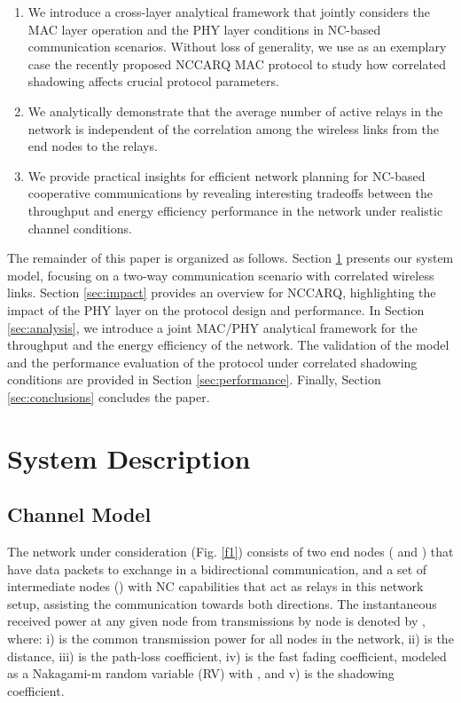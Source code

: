\documentclass[12pt,draftcls, onecolumn]{IEEEtran}
\begin{document}
\begin{enumerate}
\item We introduce a cross-layer analytical framework that jointly considers the MAC layer operation and the PHY layer conditions in NC-based communication scenarios. Without loss of generality, we use as an exemplary case the recently proposed NCCARQ MAC protocol \cite{nccarq} to study how correlated shadowing affects crucial protocol parameters.
\item We analytically demonstrate that the average number of active relays in the network is independent of the correlation among the wireless links from the end nodes to the relays.
\item We provide practical insights for efficient network planning for NC-based cooperative communications by revealing interesting tradeoffs between the throughput and energy efficiency performance in the network under realistic channel conditions.
\end{enumerate}

The remainder of this paper is organized as follows. Section \ref{sec:system} presents our system model, focusing on a two-way communication scenario with correlated wireless links. Section \ref{sec:impact} provides an overview for NCCARQ, highlighting the impact of the PHY layer on the protocol design and performance. In Section \ref{sec:analysis}, we introduce a joint MAC/PHY analytical framework for the throughput and the energy efficiency of the network. The validation of the model and the performance evaluation of the protocol under correlated shadowing conditions are provided in Section \ref{sec:performance}. Finally, Section \ref{sec:conclusions} concludes the paper.

\section{System Description}
\label{sec:system}

\subsection{Channel Model}
\label{sec:channel}

The network under consideration (Fig. \ref{f1}) consists of two end nodes ( and ) that have data packets to exchange in a bidirectional communication, and a set of  intermediate nodes () with NC capabilities that act as relays in this network setup, assisting the communication towards both directions. The instantaneous received power at any given node  from transmissions by node  is denoted by  \cite[Eq. (1.1)]{thesismary}, where: i)  is the common transmission power for all nodes in the network, ii)  is the  distance, iii)  is the path-loss coefficient, iv)  is the fast fading coefficient, modeled as a Nakagami-m random variable (RV) with , and v)  is the shadowing coefficient.
\end{document}
